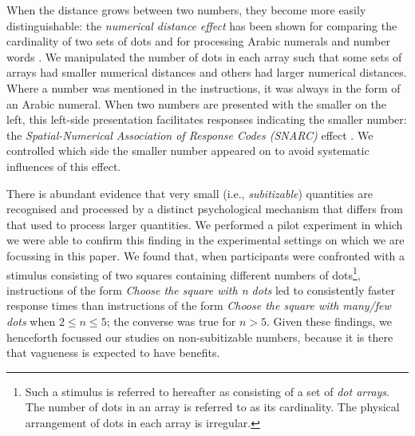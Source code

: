 When the distance grows between two numbers, they become more easily distinguishable: the \emph{numerical distance effect} has been shown for comparing the cardinality of two sets of dots \citep{van123} and for processing Arabic numerals and number words \citep{Dehaene1996}. We manipulated the number of dots in each array such that some sets of arrays had smaller numerical distances and others had larger numerical distances. Where a number was mentioned in the instructions, it was always in the form of an Arabic numeral. When two numbers are presented with the smaller on the left, this left-side presentation facilitates responses indicating the smaller number: the \emph{Spatial-Numerical Association of Response Codes (SNARC)} effect \citep{dehaene1993mental, gevers2006automatic}. We controlled which side the smaller number appeared on to avoid systematic influences of this effect. 

There is abundant evidence \citep[e.g.,][]{trick1994small} that very small (i.e., \emph{subitizable}) quantities are recognised and processed by a distinct psychological mechanism that differs from that used to process larger quantities. We performed a pilot experiment \citep{green2011costreduction} in which we were able to confirm this finding in the experimental settings on which we are focussing in this paper. We found that, when participants were confronted with a stimulus consisting of two squares containing different numbers of dots\footnote{Such a stimulus is referred to hereafter as consisting of a set of {\em dot arrays}. The number of dots in an array is referred to as its cardinality. The physical arrangement of dots in each array is irregular.}, instructions of the form \emph{Choose the square with \emph{n} dots} led to consistently faster response times than instructions of the form \emph{Choose the square with many/few dots} when $2 \leq n \leq 5$; the converse was true for $n>5$. Given these findings, we henceforth focussed our studies on non-subitizable numbers, because it is there that vagueness is expected to have benefits.

